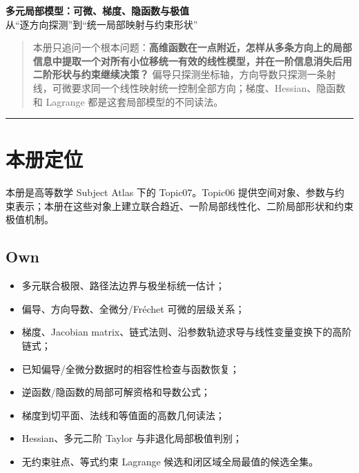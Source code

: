 \documentclass[11pt,a4paper,fontset=fandol]{ctexart}
\begin{document}
\begin{center}
{\LARGE\textbf{多元局部模型：可微、梯度、隐函数与极值}}\\[0.4em]
{\large 从“逐方向探测”到“统一局部映射与约束形状”}
\end{center}
\vspace{0.5em}

\begin{quote}
本册只追问一个根本问题：\textbf{高维函数在一点附近，怎样从多条方向上的局部信息中提取一个对所有小位移统一有效的线性模型，并在一阶信息消失后用二阶形状与约束继续决策？} 偏导只探测坐标轴，方向导数只探测一条射线，可微要求同一个线性映射统一控制全部方向；梯度、Hessian、隐函数和 Lagrange 都是这套局部模型的不同读法。
\end{quote}

\begin{center}\rule{0.5\linewidth}{0.5pt}\end{center}

\setcounter{section}{-1}
\section{本册定位}

本册是高等数学 Subject Atlas 下的 Topic07。Topic06 提供空间对象、参数与约束表示；本册在这些对象上建立联合趋近、一阶局部线性化、二阶局部形状和约束极值机制。

\subsection{Own}
\begin{itemize}
  \item 多元联合极限、路径法边界与极坐标统一估计；
  \item 偏导、方向导数、全微分/Fréchet 可微的层级关系；
  \item 梯度、Jacobian matrix、链式法则、沿参数轨迹求导与线性变量变换下的高阶链式；
  \item 已知偏导/全微分数据时的相容性检查与函数恢复；
  \item 逆函数/隐函数的局部可解资格和导数公式；
  \item 梯度到切平面、法线和等值面的高数几何读法；
  \item Hessian、多元二阶 Taylor 与非退化局部极值判别；
  \item 无约束驻点、等式约束 Lagrange 候选和闭区域全局最值的候选全集。
\end{itemize}
\end{document}
